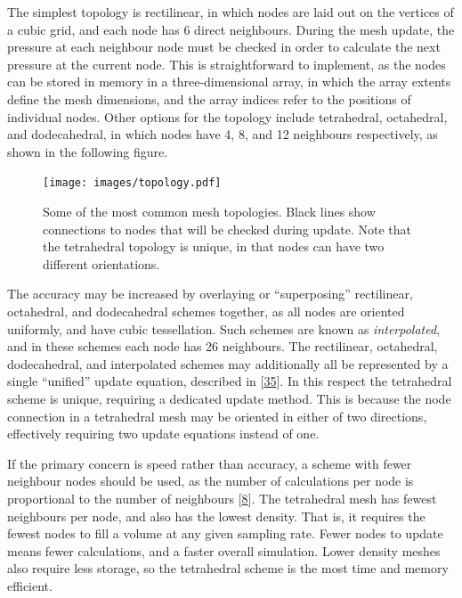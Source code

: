 \documentclass[]{scrreprt}
\begin{document}
The simplest topology is rectilinear, in which nodes are laid out on the
vertices of a cubic grid, and each node has 6 direct neighbours. During
the mesh update, the pressure at each neighbour node must be checked in
order to calculate the next pressure at the current node. This is
straightforward to implement, as the nodes can be stored in memory in a
three-dimensional array, in which the array extents define the mesh
dimensions, and the array indices refer to the positions of individual
nodes. Other options for the topology include tetrahedral, octahedral,
and dodecahedral, in which nodes have 4, 8, and 12 neighbours
respectively, as shown in the following
figure\text{ (\ref{fig:topology})}.

\begin{figure}[htbp]
\centering
\texttt{[image: images/topology.pdf]}
\caption{Some of the most common mesh topologies. Black lines show
connections to nodes that will be checked during update. Note that the
tetrahedral topology is unique, in that nodes can have two different
orientations.\label{fig:topology}}
\end{figure}

The accuracy may be increased by overlaying or ``superposing''
rectilinear, octahedral, and dodecahedral schemes together, as all nodes
are oriented uniformly, and have cubic tessellation. Such schemes are
known as \emph{interpolated}, and in these schemes each node has 26
neighbours. The rectilinear, octahedral, dodecahedral, and interpolated
schemes may additionally all be represented by a single ``unified''
update equation, described in
{[}\protect\hyperlink{ref-kowalczykux5froomux5f2011}{35}{]}. In this
respect the tetrahedral scheme is unique, requiring a dedicated update
method. This is because the node connection in a tetrahedral mesh may be
oriented in either of two directions, effectively requiring two update
equations instead of one.

If the primary concern is speed rather than accuracy, a scheme with
fewer neighbour nodes should be used, as the number of calculations per
node is proportional to the number of neighbours
{[}\protect\hyperlink{ref-camposux5fcomputationalux5f2005}{8}{]}. The
tetrahedral mesh has fewest neighbours per node, and also has the lowest
density. That is, it requires the fewest nodes to fill a volume at any
given sampling rate. Fewer nodes to update means fewer calculations, and
a faster overall simulation. Lower density meshes also require less
storage, so the tetrahedral scheme is the most time and memory
efficient.
\end{document}

